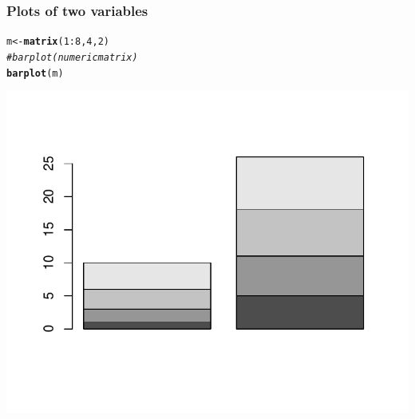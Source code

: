 \documentclass[12pt]{beamer}\usepackage[]{graphicx}\usepackage[]{color}
\makeatletter
\newcommand{\hlnum}[1]{\textcolor[rgb]{0.686,0.059,0.569}{#1}}%
\newcommand{\hlcom}[1]{\textcolor[rgb]{0.678,0.584,0.686}{\textit{#1}}}%
\newcommand{\hlopt}[1]{\textcolor[rgb]{0,0,0}{#1}}%
\newcommand{\hlstd}[1]{\textcolor[rgb]{0.345,0.345,0.345}{#1}}%
\newcommand{\hlkwb}[1]{\textcolor[rgb]{0.69,0.353,0.396}{#1}}%
\newcommand{\hlkwd}[1]{\textcolor[rgb]{0.737,0.353,0.396}{\textbf{#1}}}%
\newenvironment{kframe}{%
 \def\at@end@of@kframe{}%
 \ifinner\ifhmode%
  \def\at@end@of@kframe{\end{minipage}}%
  \begin{minipage}{\columnwidth}%
 \fi\fi%
 \def\FrameCommand##1{\hskip\@totalleftmargin \hskip-\fboxsep
 \colorbox{shadecolor}{##1}\hskip-\fboxsep
     \hskip-\linewidth \hskip-\@totalleftmargin \hskip\columnwidth}%
 \MakeFramed {\advance\hsize-\width
   \@totalleftmargin\z@ \linewidth\hsize
   \@setminipage}}%
 {\par\unskip\endMakeFramed%
 \at@end@of@kframe}
\newenvironment{knitrout}{}{} %
\makeatother
\begin{document}
\begin{frame}[fragile]
\frametitle{Plots of two variables}
\begin{knitrout}\footnotesize
{}\color{fgcolor}\begin{kframe}
\begin{alltt}
\hlstd{m} \hlkwb{<-} \hlkwd{matrix}\hlstd{(}\hlnum{1}\hlopt{:}\hlnum{8}\hlstd{,} \hlnum{4}\hlstd{,} \hlnum{2}\hlstd{)}
\hlcom{# barplot (numeric matrix)}
\hlkwd{barplot}\hlstd{(m)}
\end{alltt}
\end{kframe}

{\centering \includegraphics[width=.7\linewidth,height=.6\linewidth]{figure/unnamed-chunk-15-1} 

}



\end{knitrout}
\end{frame}

\end{document}
